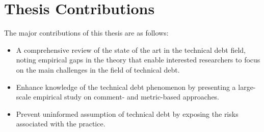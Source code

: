 \section{Thesis Contributions}
The major contributions of this thesis are as follows:
\begin{itemize}
	\item A comprehensive review of the state of the art in the technical debt field, noting empirical gaps in the theory that enable interested researchers to focus on the main challenges in the field of technical debt.
	\item Enhance knowledge of the technical debt phenomenon by presenting a large-scale empirical study on comment- and metric-based approaches.
	\item Prevent uninformed assumption of technical debt by exposing the risks associated with the practice.

\end{itemize}